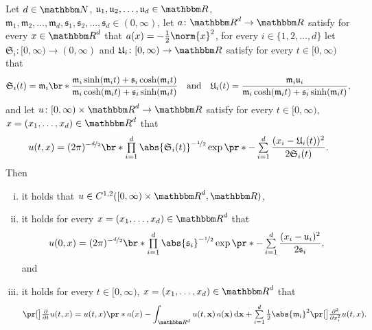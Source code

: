 \begin{lemma}\label{lem:aniso_mutator_selector}
	Let
		$d \in \N$,
		$\mathfrak{u}_1,\mathfrak{u}_2, \dots,\mathfrak{u}_d\in \R$,
		$\mathfrak{m}_1,\mathfrak{m}_2, \dots,\mathfrak{m}_d,
		\mathfrak{s}_1,\mathfrak{s}_2, \dots,\mathfrak{s}_d \in (0,\infty)$,
	let
		$a \colon \R^d \to \R$
	satisfy 
		for every
			$x \in \R^d$
		that
			$a(x) = -\frac{1}{2} \norm{x}^2$,
	for every 
		$i \in \{1,2,\dots,d\}$
		let
			$\mathfrak{S}_i \colon [0,\infty) \to (0,\infty)$ and
			$\mathfrak{U}_i \colon [0,\infty) \to \R$
			satisfy for every
				$t \in [0,\infty)$
			that
			\begin{equation}\label{lem:S_U}
				\mathfrak{S}_i(t) 
				=
				\mathfrak{m}_i \br*{ \frac{\mathfrak{m}_i \sinh(\mathfrak{m}_i  t) + \mathfrak{s}_i \cosh(\mathfrak{m}_i t)}{\mathfrak{m}_i \cosh(\mathfrak{m}_i  t) + \mathfrak{s}_i \sinh(\mathfrak{m}_i t)}}
				\quad \text{and} \quad
				\mathfrak{U}_i(t)
				=
				\frac{\mathfrak{m}_i \mathfrak{u}_i}{\mathfrak{m}_i \cosh(\mathfrak{m}_i  t) + \mathfrak{s}_i \sinh(\mathfrak{m}_i t)}
				,
			\end{equation}
	and let
		$u \colon [0,\infty) \times \R^d \to \R $
	satisfy 
		for every
			$t \in [0,\infty)$,
			$x = (x_1,\dots,x_d)\in \R^d$
		that
		\begin{equation}\label{eq:lem_aniso}
			u(t,x)
			=
			(2\pi)^{- \nicefrac{d}{2}} \br*{ \smallprodl_{ i = 1 }^d \abs{\mathfrak{S}_i(t)}^{- \nicefrac{1}{2}} }     \exp\pr*{-\smallsuml_{i = 1}^d \frac{(x_i -\mathfrak{U}_i(t) )^2}{2\mathfrak{S}_i(t)}}
			.
		\end{equation}
	Then
	\begin{enumerate}[(i)] %
		\item \label{lem:it_smoothness} 
			it holds that
				$u  \in C^{1,2}([0,\infty)\times\R^d,\R)$,
		\item \label{lem:it_u0} 
			it holds for every
				$x = (x_1,\dots,x_d)\in \R^d$
			that
			\begin{equation}
				u(0,x) = (2\pi)^{-\nicefrac{d}{2}} \br*{\smallprodl_{ i = 1 }^d \abs{\mathfrak{s}_i}^{-\nicefrac{1}{2}}} \exp\pr*{-\smallsuml_{i = 1}^d \frac{(x_i - \mathfrak{u}_i )^2}{2\mathfrak{s}_i}},
			\end{equation}
			and
	    \item \label{lem:it_eq} 
			it holds for every
				$t \in [0,\infty)$,
				$x = (x_1,\dots,x_d)\in \R^d$
			that
			\begin{equation}
				\label{eq:lemma_replicator_mutator}
				\bpr{\tfrac{\partial }{\partial t}u} (t,x)
				=
				u(t,x)\pr*{a(x) - \int_{\R^d} u(t,\mathbf{x})\, a(\mathbf{x}) \, \diff\mathbf{x} } + \smallsuml_{i=1}^{d} \tfrac{1}{2} \abs{\mathfrak{m}_i}^2\bpr{\tfrac{\partial^2 }{\partial x_i^2} u} (t,x)
				.
			\end{equation}
	\end{enumerate}
\end{lemma}

